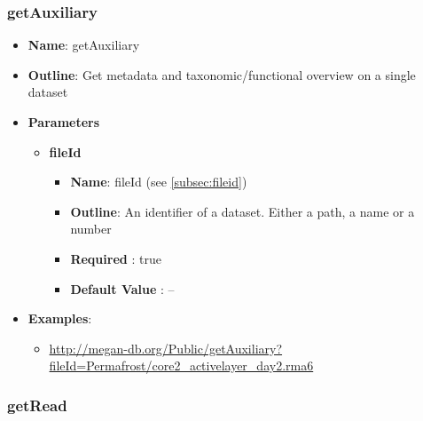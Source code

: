 \documentclass[11pt]{article}
\begin{document}
\subsubsection{getAuxiliary}

\begin{itemize}
	\item \textbf{Name}: getAuxiliary
	\item \textbf{Outline}: Get metadata and taxonomic/functional overview on a single dataset
	\item \textbf{Parameters}
		\begin{itemize}
			\item \textbf{fileId}
				\begin{itemize}
					\item \textbf{Name}: fileId (see \ref{subsec:fileid})
					\item \textbf{Outline}: An identifier of a dataset. Either a path, a name or a number
					\item \textbf{Required} : true
					\item \textbf{Default Value} : --
				\end{itemize}
		\end{itemize}
	\item \textbf{Examples}:
		\begin{itemize}
			\item \url{http://megan-db.org/Public/getAuxiliary?fileId=Permafrost/core2_activelayer_day2.rma6}
		\end{itemize}
\end{itemize}

\subsubsection{getRead}
\end{document}

